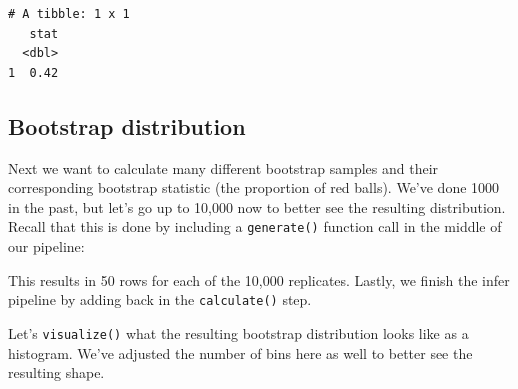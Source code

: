 \documentclass[12pt,]{krantz}
\makeatletter
\newenvironment{Shaded}{\begin{snugshade}}{\end{snugshade}}
\newcommand{\KeywordTok}[1]{\textcolor[rgb]{0.27,0.27,0.27}{\textbf{#1}}}
\newcommand{\DataTypeTok}[1]{\textcolor[rgb]{0.27,0.27,0.27}{#1}}
\newcommand{\DecValTok}[1]{\textcolor[rgb]{0.06,0.06,0.06}{#1}}
\newcommand{\StringTok}[1]{\textcolor[rgb]{0.5,0.5,0.5}{#1}}
\newcommand{\OtherTok}[1]{\textcolor[rgb]{0.37,0.37,0.37}{#1}}
\newcommand{\OperatorTok}[1]{\textcolor[rgb]{0.43,0.43,0.43}{\textbf{#1}}}
\newcommand{\NormalTok}[1]{#1}
\newenvironment{kframe}{%
\medskip{}
\setlength{\fboxsep}{.8em}
 \def\at@end@of@kframe{}%
 \ifinner\ifhmode%
  \def\at@end@of@kframe{\end{minipage}}%
  \begin{minipage}{\columnwidth}%
 \fi\fi%
 \def\FrameCommand##1{\hskip\@totalleftmargin \hskip-\fboxsep
 \colorbox{shadecolor}{##1}\hskip-\fboxsep
     \hskip-\linewidth \hskip-\@totalleftmargin \hskip\columnwidth}%
 \MakeFramed {\advance\hsize-\width
   \@totalleftmargin\z@ \linewidth\hsize
   \@setminipage}}%
 {\par\unskip\endMakeFramed%
 \at@end@of@kframe}
\renewenvironment{Shaded}{\begin{kframe}}{\end{kframe}}
\makeatother
\begin{document}
\begin{verbatim}
# A tibble: 1 x 1
   stat
  <dbl>
1  0.42
\end{verbatim}

\subsection{Bootstrap distribution}\label{bootstrap-distribution-1}

Next we want to calculate many different bootstrap samples and their
corresponding bootstrap statistic (the proportion of red balls). We've
done 1000 in the past, but let's go up to 10,000 now to better see the
resulting distribution. Recall that this is done by including a
\texttt{generate()} function call in the middle of our pipeline:

\begin{Shaded}
\end{Shaded}

This results in 50 rows for each of the 10,000 replicates. Lastly, we
finish the infer pipeline by adding back in the \texttt{calculate()}
step.

\begin{Shaded}
\end{Shaded}

Let's \texttt{visualize()} what the resulting bootstrap distribution
looks like as a histogram. We've adjusted the number of bins here as
well to better see the resulting shape.
\end{document}
